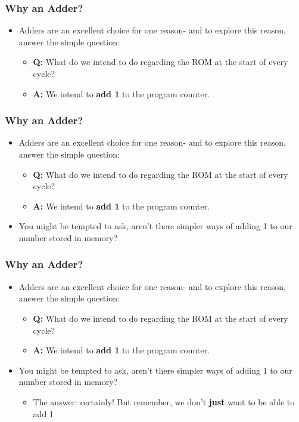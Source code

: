 \documentclass{beamer}
\begin{document}
       
       \begin{frame}
			\frametitle{Why an Adder?}
			\begin{itemize}
				\item Adders are an excellent choice for one reason- and to explore this reason, answer the simple question:
				\begin{itemize}
					\item \textbf{Q:} What do we intend to do regarding the ROM at the start of every cycle?
					\item \textbf{A:} We intend to \textbf{add 1} to the program counter.
				\end{itemize}
			\end{itemize}
		\end{frame}
             
             
        \begin{frame}
			\frametitle{Why an Adder?}
			\begin{itemize}
				\item Adders are an excellent choice for one reason- and to explore this reason, answer the simple question:
				\begin{itemize}
					\item \textbf{Q:} What do we intend to do regarding the ROM at the start of every cycle?
					\item \textbf{A:} We intend to \textbf{add 1} to the program counter.
				\end{itemize}
				\item You might be tempted to ask, aren't there simpler ways of adding 1 to our number stored in memory?
			\end{itemize}
		\end{frame}
		
		\begin{frame}
			\frametitle{Why an Adder?}
			\begin{itemize}
				\item Adders are an excellent choice for one reason- and to explore this reason, answer the simple question:
				\begin{itemize}
					\item \textbf{Q:} What do we intend to do regarding the ROM at the start of every cycle?
					\item \textbf{A:} We intend to \textbf{add 1} to the program counter.
				\end{itemize}
				\item You might be tempted to ask, aren't there simpler ways of adding 1 to our number stored in memory?
				\begin{itemize}
					\item The answer: certainly! But remember, we don't \textbf{just} want to be able to add 1
				\end{itemize}
			\end{itemize}
		\end{frame}
		
\end{document}
